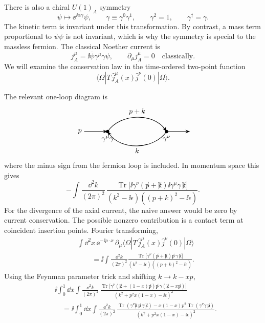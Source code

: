 There is also a chiral \(U(1)_A\) symmetry
\[
  \psi\longmapsto \ee^{\ii\alpha\gamma}\psi,
  \qquad
  \gamma\equiv\gamma^0\gamma^1,
  \qquad
  \gamma^2=1,
  \qquad
  \gamma^\dagger=\gamma .
\]
The kinetic term is invariant under this transformation.  By contrast, a
mass term proportional to \(\overline\psi\psi\) is not invariant, which
is why the symmetry is special to the massless fermion.  The classical
Noether current is
\[
  j_A^\mu=\ii\overline\psi\gamma^\mu\gamma\psi ,
  \qquad
  \partial_\mu j_A^\mu=0
  \quad\text{classically}.
\]
We will examine the conservation law in the time-ordered two-point
function
\[
  \langle\Omega|T\,\widehat j_A^\mu(x)\widehat j^\nu(0)|\Omega\rangle .
\]

The relevant one-loop diagram is
\[
\begin{tikzpicture}[>=Stealth,scale=1.0,baseline={(0,-0.2)},
  fermion/.style={line width=0.75pt},
  current/.style={circle,fill=black,inner sep=1.7pt}]
  \coordinate (L) at (-1.45,0);
  \coordinate (R) at (1.45,0);
  \draw[fermion,->] (L) to[bend left=55] node[above] {\(p+k\)} (R);
  \draw[fermion,->] (R) to[bend left=55] node[below] {\(k\)} (L);
  \draw[fermion,->] (-2.6,0) -- (L);
  \draw[fermion,->] (R) -- (2.6,0);
  \node[current,label=below:\(\gamma^\mu\gamma\)] at (L) {};
  \node[current,label=below:\(\gamma^\nu\)] at (R) {};
  \node[left] at (-2.6,0) {\(p\)};
\end{tikzpicture}
\]
where the minus sign from the fermion loop is included.  In momentum
space this gives
\[
  -\int\frac{\dd^2k}{(2\pi)^2}\,
  \frac{
    \operatorname{Tr}\bigl[
      \ii\gamma^\nu(\not p+\not k)
      \ii\gamma^\mu\gamma\,\not k
    \bigr]
  }{(k^2-\ii\epsilon)((p+k)^2-\ii\epsilon)} .
\]
For the divergence of the axial current, the naive answer would be zero
by current conservation.  The possible nonzero contribution is a contact
term at coincident insertion points.  Fourier transforming,
\[
\begin{aligned}
  &\int\dd^2x\,\ee^{-\ii p\cdot x}\,
  \partial_\mu
  \langle\Omega|T\,\widehat j_A^\mu(x)\widehat j^\nu(0)|\Omega\rangle
\\
  &\qquad =
  \ii\int\frac{\dd^2k}{(2\pi)^2}
  \frac{
    \operatorname{Tr}\bigl[
      \gamma^\nu(\not p+\not k)\not p\,\gamma\,\not k
    \bigr]
  }{(k^2-\ii\epsilon)((p+k)^2-\ii\epsilon)} .
\end{aligned}
\]
Using the Feynman parameter trick and shifting \(k\to k-xp\),
\[
\begin{aligned}
  &\ii\int_0^1\dd x
  \int\frac{\dd^2k}{(2\pi)^2}\,
  \frac{
    \operatorname{Tr}\bigl[
      \gamma^\nu(\not k+(1-x)\not p)
      \not p\,\gamma(\not k-x\not p)
    \bigr]
  }{(k^2+p^2x(1-x)-\ii\epsilon)^2}
\\
  &\quad =
  \ii\int_0^1\dd x
  \int\frac{\dd^2k}{(2\pi)^2}\,
  \frac{
    \operatorname{Tr}(\gamma^\nu\not k\,\not p\,\gamma\,\not k)
    -x(1-x)p^2
    \operatorname{Tr}(\gamma^\nu\gamma\,\not p)
  }{(k^2+p^2x(1-x)-\ii\epsilon)^2}.
\end{aligned}
\]
